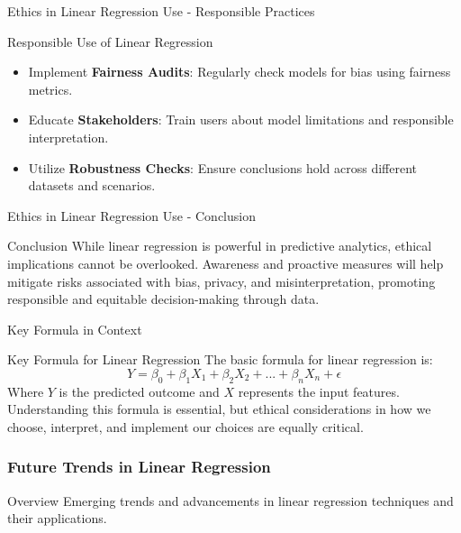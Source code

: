 \documentclass[aspectratio=169]{beamer}
\begin{document}
\begin{frame}[fragile]{Ethics in Linear Regression Use - Responsible Practices}
    \begin{block}{Responsible Use of Linear Regression}
        \begin{itemize}
            \item Implement \textbf{Fairness Audits}: Regularly check models for bias using fairness metrics.
            \item Educate \textbf{Stakeholders}: Train users about model limitations and responsible interpretation.
            \item Utilize \textbf{Robustness Checks}: Ensure conclusions hold across different datasets and scenarios.
        \end{itemize}
    \end{block}
\end{frame}

\begin{frame}[fragile]{Ethics in Linear Regression Use - Conclusion}
    \begin{block}{Conclusion}
        While linear regression is powerful in predictive analytics, ethical implications cannot be overlooked. Awareness and proactive measures will help mitigate risks associated with bias, privacy, and misinterpretation, promoting responsible and equitable decision-making through data.
    \end{block}
\end{frame}

\begin{frame}[fragile]{Key Formula in Context}
    \begin{block}{Key Formula for Linear Regression}
        The basic formula for linear regression is:
        \begin{equation}
            Y = \beta_0 + \beta_1X_1 + \beta_2X_2 + ... + \beta_nX_n + \epsilon 
        \end{equation}
        Where \(Y\) is the predicted outcome and \(X\) represents the input features. Understanding this formula is essential, but ethical considerations in how we choose, interpret, and implement our choices are equally critical.
    \end{block}
\end{frame}

\begin{frame}[fragile]
    \frametitle{Future Trends in Linear Regression}
    \begin{block}{Overview}
        Emerging trends and advancements in linear regression techniques and their applications.
    \end{block}
\end{frame}
\end{document}
